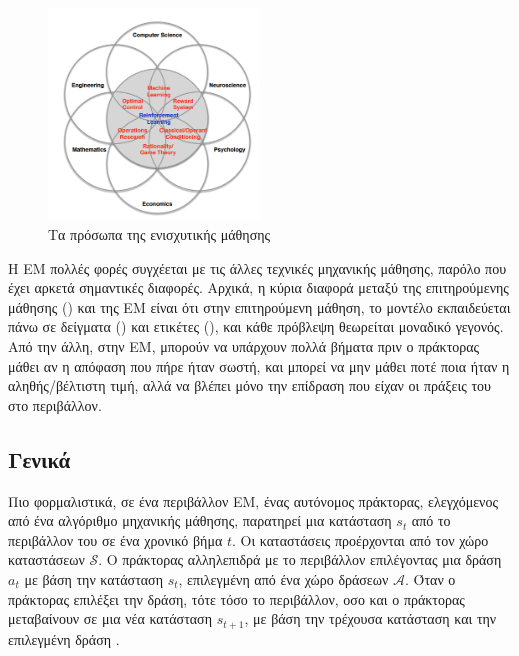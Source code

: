 \begin{figure}[h]
    \includegraphics[width=0.5\textwidth]{body_matter/chapter1/images/faces_of_rl.png}
    \Centering
    \caption{Τα πρόσωπα της ενισχυτικής μάθησης}
    \label{fig:faces_rl}
\end{figure}

Η ΕΜ πολλές φορές συγχέεται με τις άλλες τεχνικές μηχανικής μάθησης, παρόλο που έχει αρκετά σημαντικές διαφορές.
Αρχικά, η κύρια διαφορά μεταξύ της επιτηρούμενης μάθησης () και της ΕΜ είναι ότι στην επιτηρούμενη
μάθηση, το μοντέλο εκπαιδεύεται πάνω σε δείγματα () και ετικέτες (), και κάθε πρόβλεψη θεωρείται
μοναδικό γεγονός. Από την άλλη, στην ΕΜ, μπορούν να υπάρχουν πολλά βήματα πριν ο πράκτορας μάθει αν η απόφαση που πήρε ήταν
σωστή, και μπορεί να μην μάθει ποτέ ποια ήταν η αληθής/βέλτιστη τιμή, αλλά να βλέπει μόνο την επίδραση που είχαν οι πράξεις
του στο περιβάλλον.


\subsection{Γενικά}

Πιο φορμαλιστικά, σε ένα περιβάλλον ΕΜ, ένας αυτόνομος πράκτορας, ελεγχόμενος από ένα αλγόριθμο μηχανικής μάθησης,
παρατηρεί μια κατάσταση $s_t$ από το περιβάλλον του σε ένα χρονικό βήμα $t$. Οι καταστάσεις προέρχονται από τον
χώρο καταστάσεων $\mathcal{S}$. Ο πράκτορας αλληλεπιδρά με το περιβάλλον επιλέγοντας μια δράση $a_t$ με βάση την κατάσταση
$s_t$, επιλεγμένη από ένα χώρο δράσεων $\mathcal{A}$. Όταν ο πράκτορας επιλέξει την δράση, τότε τόσο το περιβάλλον,
οσο και ο πράκτορας μεταβαίνουν σε μια νέα κατάσταση $s_{t+1}$, με βάση την τρέχουσα κατάσταση και την επιλεγμένη
δράση \cite{drlbs}.

